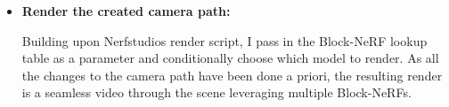 \begin{itemize}
    \item \textbf{Render the created camera path:}

    Building upon Nerfstudios render script, I pass in the Block-NeRF lookup table as a parameter and conditionally choose which model to render. As all the changes to the camera path have been done a priori, the resulting render is a seamless video through the scene leveraging multiple Block-NeRFs.
\end{itemize}



\begin{comment}
\begin{algorithmic}[1]
\Function{transform\_to\_single\_camera\_path}{}
    \State $block\_lookup$ \Comment{Lookup block to render at a certain c2w}
    \For{$c2w$ \textbf{in} $camera\_path$}
        \State $block \gets block\_lookup[c2w]$
        \State $t \gets block.dataparser\_transform["transform"]$
        \State $s \gets block.dataparser\_transform["scale"]$
        \State $new\_c2w \gets (t \times c2w) \times s$
        \State $camera \gets new\_c2w$
    \EndFor
\EndFunction
\end{algorithmic}


\begin{algorithmic}[1]
\Function{transform\_to\_single\_camera\_path}{$camera\_path\_path, block\_lookup, dataparser\_transform\_paths, export\_dir$}
    \State $original\_camera\_path \gets$ \Call{load\_json}{$camera\_path\_path$}
    \State $new\_camera\_path \gets$ \Call{copy.deepcopy}{$original\_camera\_path$}

    \For{$i \gets 0$ \textbf{to} $len(new\_camera\_path["camera\_path"]) - 1$}
        \State $block\_name \gets block\_lookup[str(i)]$
        \State $transform \gets$ \Call{load\_json}{$dataparser\_transform\_paths[block\_name]$}
        \State $t \gets$ \Call{np.array}{$transform["transform"]$}
        \State $s \gets transform["scale"]$

        \State $c2w \gets$ \Call{np.array}{$new\_camera\_path["camera\_path"][i]["camera\_to\_world"]$}.\Call{reshape}{4, 4}
        \State $c2w \gets (t \times c2w) \times s$
        \State $c2w \gets$ \Call{np.vstack}{($c2w$, \Call{np.array}{[0, 0, 0, 1]})}
        \State $new\_camera\_path["camera\_path"][i]["camera\_to\_world"] \gets c2w.\Call{reshape}{16}.\Call{tolist}{}$
    \EndFor
\EndFunction
\end{algorithmic}
\end{comment}

